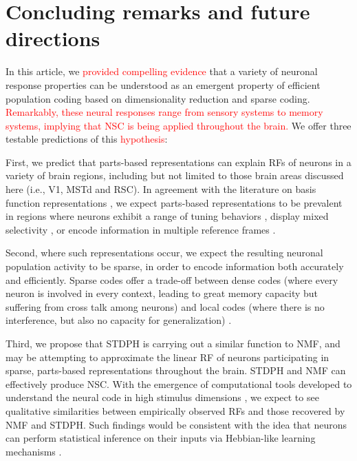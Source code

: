 \section{Concluding remarks and future directions}
\label{sec:conclusion}

In this article, we \textcolor{red}{provided compelling evidence} that a variety of neuronal response properties can be understood as an emergent property of efficient population coding based on dimensionality reduction and sparse coding. \textcolor{red}{Remarkably, these neural responses range from sensory systems to memory systems, implying that \ac{NSC} is being applied throughout the brain.} We offer three testable predictions of this \textcolor{red}{hypothesis}:

First, we predict that parts-based representations can explain
\acp{RF} of neurons in a variety of brain regions,
including but not limited to those brain areas discussed here (i.e., V1, MSTd and RSC). In agreement with the literature on basis function representations
\citep{PougetSejnowski1997,PougetSnyder2000,Poggio1990},
we expect parts-based representations
to be prevalent in regions where neurons
exhibit a range of tuning behaviors \citep{Beyeler2016},
display mixed selectivity \citep{Fusi2016,Eichenbaum2017},
or encode information in multiple reference frames \citep{AlexanderNitz2015,Rounds2016}.

Second, where such representations occur, we expect the resulting
neuronal population activity to be sparse,
in order to encode information both accurately and efficiently.
Sparse codes offer a trade-off between 
dense codes (where every neuron is involved in every context,
leading to great memory capacity but suffering from cross talk among neurons)
and local codes (where there is no interference, 
but also no capacity for generalization) \citep{Spanne2015417}.

Third, we propose that \ac{STDPH} is carrying out a similar function to \ac{NMF},
and may be attempting to approximate the linear \ac{RF} of
neurons participating in sparse, parts-based representations
throughout the brain. STDPH and NMF can effectively produce NSC.
With the emergence of computational tools developed
to understand the neural code 
in high stimulus dimensions \citep{PillowSimoncelli2006},
we expect to see qualitative similarities between empirically observed
\acp{RF} and those recovered by \ac{NMF} and \ac{STDPH}.
Such findings would be consistent with the idea that neurons
can perform statistical inference on their inputs via
Hebbian-like learning mechanisms
\citep{Nessler2009,Carlson2013,MorenoBoteDrugowitsch2015,Oja1982}.

